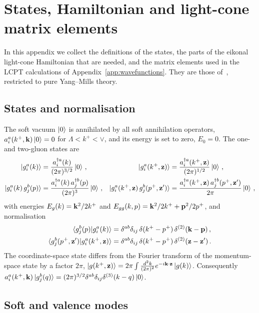 \section{States, Hamiltonian and light-cone matrix elements}\label{app:hamiltonian}

In this appendix we collect the definitions of the states, the parts of the eikonal light-cone Hamiltonian that are needed, and the matrix elements used in the LCPT calculations of Appendix~\ref{app:wavefunctions}. They are those of~\cite{Radhakrishnan:2026soft,Lublinsky:2016meo}, restricted to pure Yang--Mills theory.

\subsection{States and normalisation}\label{app:states}

The soft vacuum $\ket0$ is annihilated by all soft annihilation operators, $a^a_i(k^+,\mathbf{k})\ket0=0$ for $\Lambda<k^+<\vee$, and its energy is set to zero, $E_0=0$. The one- and two-gluon states are
\begin{align}
\ket{g^a_i(k)}&=\frac{a^{\dagger a}_i(k)}{(2\pi)^{3/2}}\ket0\,,&
\ket{g^a_i(k^+,\mathbf{z})}&=\frac{a^{\dagger a}_i(k^+,\mathbf{z})}{(2\pi)^{1/2}}\ket0\,,\notag\\
\ket{g^a_i(k)\,g^b_j(p)}&=\frac{a^{\dagger a}_i(k)\,a^{\dagger b}_j(p)}{(2\pi)^3}\ket0\,,&
\ket{g^a_i(k^+,\mathbf{z})\,g^b_j(p^+,\mathbf{z}')}&=\frac{a^{\dagger a}_i(k^+,\mathbf{z})\,a^{\dagger b}_j(p^+,\mathbf{z}')}{2\pi}\ket0\,,
\end{align}
with energies $E_g(k)=\mathbf{k}^2/2k^+$ and $E_{gg}(k,p)=\mathbf{k}^2/2k^++\mathbf{p}^2/2p^+$, and normalisation
\begin{align}
\braket{g^b_j(p)|g^a_i(k)}&=\delta^{ab}\delta_{ij}\,\delta(k^+-p^+)\,\delta^{(2)}(\mathbf{k}-\mathbf{p})\,,\notag\\
\braket{g^b_j(p^+,\mathbf{z}')|g^a_i(k^+,\mathbf{z})}&=\delta^{ab}\delta_{ij}\,\delta(k^+-p^+)\,\delta^{(2)}(\mathbf{z}-\mathbf{z}')\,.
\end{align}
The coordinate-space state differs from the Fourier transform of the momentum-space state by a factor $2\pi$, $\ket{g(k^+,\mathbf{z})}=2\pi\int\frac{d^2k}{(2\pi)^2}e^{-i\mathbf{k}\cdot\mathbf{z}}\ket{g(k)}$. Consequently $a^a_i(k^+,\mathbf{k})\ket{g^b_j(q)}=(2\pi)^{3/2}\delta^{ab}\delta_{ij}\delta^{(3)}(k-q)\ket0$.

\subsection{Soft and valence modes}

